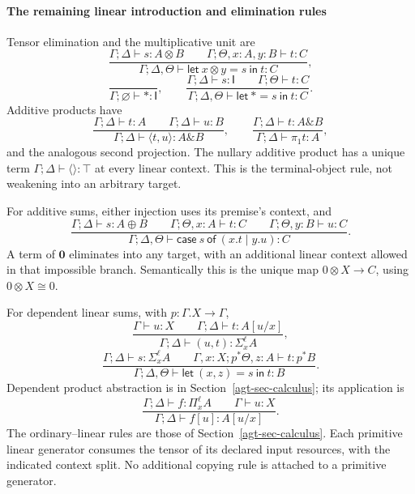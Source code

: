 \documentclass[11pt,a4paper]{article}
\numberwithin{equation}{section}
\theoremstyle{definition}
\theoremstyle{remark}
\theoremstyle{plain}
\providecommand{\I}{\mathsf{I}}
\providecommand{\Top}{\top}
\providecommand{\botell}{\mathbf{0}}
\providecommand{\ordturn}{\vdash}
\providecommand{\linturn}{\vdash}
\begin{document}
\paragraph{The remaining linear introduction and elimination rules}

Tensor elimination and the multiplicative unit are
\[
 \frac{\Gamma;\Delta\linturn s:A\otimes B\qquad
       \Gamma;\Theta,x:A,y:B\linturn t:C}
      {\Gamma;\Delta,\Theta\linturn
       \mathsf{let}\ x\otimes y=s\ \mathsf{in}\ t:C},
\]
\[
 \frac{}{\Gamma;\varnothing\linturn *:\I},\qquad
 \frac{\Gamma;\Delta\linturn s:\I\qquad\Gamma;\Theta\linturn t:C}
      {\Gamma;\Delta,\Theta\linturn
       \mathsf{let}\ *=s\ \mathsf{in}\ t:C}.
\]
Additive products have
\[
 \frac{\Gamma;\Delta\linturn t:A\qquad\Gamma;\Delta\linturn u:B}
      {\Gamma;\Delta\linturn\langle t,u\rangle:A\mathbin{\&}B},
 \qquad
 \frac{\Gamma;\Delta\linturn t:A\mathbin{\&}B}
      {\Gamma;\Delta\linturn\pi_1t:A},
\]
and the analogous second projection. The nullary additive product has a
unique term $\Gamma;\Delta\linturn\langle\rangle:\Top$ at every
linear context. This is the terminal-object rule, not weakening into an
arbitrary target.

For additive sums, either injection uses its premise's context, and
\[
 \frac{\Gamma;\Delta\linturn s:A\oplus B\qquad
       \Gamma;\Theta,x:A\linturn t:C\qquad
       \Gamma;\Theta,y:B\linturn u:C}
      {\Gamma;\Delta,\Theta\linturn
       \mathsf{case}\ s\ \mathsf{of}\ (x.t\mid y.u):C}.
\]
A term of $\botell$ eliminates into any target, with an additional linear
context allowed in that impossible branch. Semantically this is the unique
map $0\otimes X\to C$, using $0\otimes X\cong0$.

For dependent linear sums, with $p:\Gamma.X\to\Gamma$,
\[
 \frac{\Gamma\ordturn u:X\qquad\Gamma;\Delta\linturn t:A[u/x]}
      {\Gamma;\Delta\linturn(u,t):\Sigma_x^\ell A},
\]
\[
 \frac{\Gamma;\Delta\linturn s:\Sigma_x^\ell A\qquad
       \Gamma,x:X;p^*\Theta,z:A\linturn t:p^*B}
      {\Gamma;\Delta,\Theta\linturn
       \mathsf{let}\ (x,z)=s\ \mathsf{in}\ t:B}.
\]
Dependent product abstraction is in Section~\ref{agt-sec-calculus}; its
application is
\[
 \frac{\Gamma;\Delta\linturn f:\Pi_x^\ell A\qquad
       \Gamma\ordturn u:X}
      {\Gamma;\Delta\linturn f[u]:A[u/x]}.
\]
The ordinary--linear rules are those of
Section~\ref{agt-sec-calculus}. Each primitive linear generator
consumes the tensor of its declared input resources, with the indicated
context split. No additional copying rule is attached to a primitive
generator.
\end{document}
